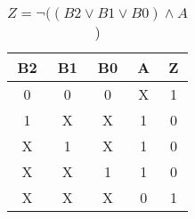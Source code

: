 
\begin{center}
    \begin{table}[h] \caption{\(Z = \lnot ((B2 \lor B1 \lor B0) \land A \))}
        \begin{center}
            \begin{tabular}{|c|c|c|c||c|} \hline
            B2 & B1 & B0 & A & Z \\ \hline\hline
            0  & 0  & 0  & X & 1 \\ \hline
            1  & X  & X  & 1 & 0 \\ \hline
            X  & 1  & X  & 1 & 0 \\ \hline
            X  & X  & 1  & 1 & 0 \\ \hline
            X  & X  & X  & 0 & 1 \\ \hline
            \end{tabular}
        \end{center}
    \end{table}
\end{center}

